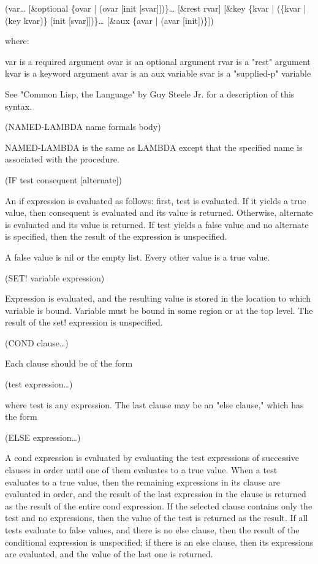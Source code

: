 \documentclass[11pt]{article}
\begin{document}
(var\ldots{}
 [\&optional \{ovar | (ovar [init [svar]])\}\ldots{}
 [\&rest rvar]
 [\&key \{kvar | (\{kvar | (key kvar)\} [init [svar]])\}\ldots{}
 [\&aux \{avar | (avar [init])\}])

where:

var is a required argument
ovar is an optional argument
rvar is a "rest" argument
kvar is a keyword argument
avar is an aux variable
svar is a "supplied-p" variable

See "Common Lisp, the Language" by Guy Steele Jr. for a description of
this syntax.

(NAMED-LAMBDA name formals body)

NAMED-LAMBDA is the same as LAMBDA except that the specified name is
associated with the procedure.

(IF test consequent [alternate])

An if expression is evaluated as follows: first, test is evaluated. If
it yields a true value, then consequent is evaluated and its value is
returned. Otherwise, alternate is evaluated and its value is
returned. If test yields a false value and no alternate is specified,
then the result of the expression is unspecified.

A false value is nil or the empty list.  Every other value is a true
value.

(SET! variable expression)

Expression is evaluated, and the resulting value is stored in the
location to which variable is bound. Variable must be bound in some
region or at the top level. The result of the set! expression is
unspecified.

(COND clause\ldots{})

Each clause should be of the form

(test expression\ldots{})

where test is any expression. The last clause may be an "else clause,"
which has the form

(ELSE expression\ldots{})

A cond expression is evaluated by evaluating the test expressions of
successive clauses in order until one of them evaluates to a true
value. When a test evaluates to a true value, then the remaining
expressions in its clause are evaluated in order, and the result of the
last expression in the clause is returned as the result of the entire
cond expression. If the selected clause contains only the test and no
expressions, then the value of the test is returned as the result. If
all tests evaluate to false values, and there is no else clause, then
the result of the conditional expression is unspecified; if there is an
else clause, then its expressions are evaluated, and the value of the
last one is returned.
\end{document}
